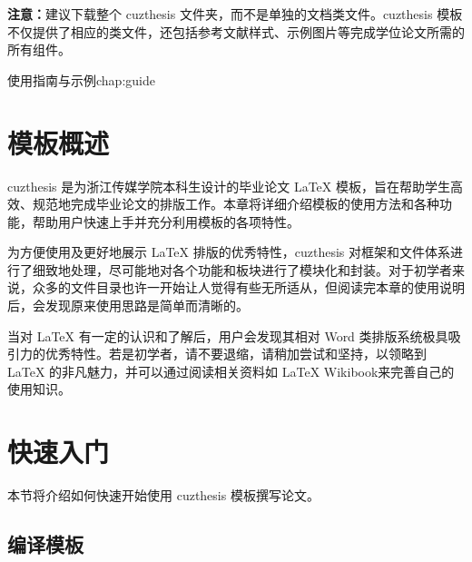     \begin{leftbar}
        \noindent\textbf{注意：}建议下载整个 cuzthesis 文件夹，而不是单独的文档类文件。cuzthesis 模板不仅提供了相应的类文件，还包括参考文献样式、示例图片等完成学位论文所需的所有组件。
    \end{leftbar}
\begin{cuzchapter}{使用指南与示例}{chap:guide}


    \section{模板概述}\label{sec:overview}

    cuzthesis 是为浙江传媒学院本科生设计的毕业论文 \LaTeX{} 模板，旨在帮助学生高效、规范地完成毕业论文的排版工作。本章将详细介绍模板的使用方法和各种功能，帮助用户快速上手并充分利用模板的各项特性。

    为方便使用及更好地展示 \LaTeX{} 排版的优秀特性，cuzthesis 对框架和文件体系进行了细致地处理，尽可能地对各个功能和板块进行了模块化和封装。对于初学者来说，众多的文件目录也许一开始让人觉得有些无所适从，但阅读完本章的使用说明后，会发现原来使用思路是简单而清晰的。

    当对 \LaTeX{} 有一定的认识和了解后，用户会发现其相对 Word 类排版系统极具吸引力的优秀特性。若是初学者，请不要退缩，请稍加尝试和坚持，以领略到 \LaTeX{} 的非凡魅力，并可以通过阅读相关资料如 \LaTeX{} Wikibook\citep{wikibook2014latex}来完善自己的使用知识。


    \section{快速入门}\label{sec:quickstart}

    本节将介绍如何快速开始使用 cuzthesis 模板撰写论文。

    \subsection{编译模板}


\end{cuzchapter}
